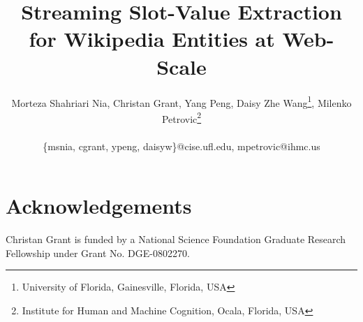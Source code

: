 \documentclass[letterpaper]{article}
\begin{document}
\title{Streaming Slot-Value Extraction for Wikipedia Entities at Web-Scale}





\author{Morteza Shahriari Nia, Christan Grant, Yang Peng, Daisy Zhe Wang\footnote{University of Florida, Gainesville, Florida, USA}, Milenko Petrovic\footnote{Institute for Human and Machine Cognition, Ocala, Florida, USA}\\
       \\
       {\{msnia, cgrant, ypeng, daisyw\}@cise.ufl.edu,}
       {mpetrovic@ihmc.us}
}

\maketitle







%





%

\section*{Acknowledgements}
Christan Grant is funded by a National Science Foundation Graduate Research Fellowship under Grant No. DGE-0802270. 

%
%




%
\end{document}
